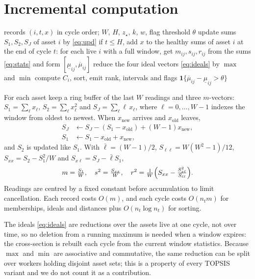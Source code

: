 \documentclass[journal,10pt,twocolumn]{IEEEtran}
\begin{document}
\section{Incremental computation}
\label{sec:stream}
\begin{algorithm}[t]
\caption{Windowed IT2-TOPSIS on a record stream}
\label{alg:main}
\begin{algorithmic}[1]
\REQUIRE records $(i,t,x)$ in cycle order; $W$, $H$, $z_\star$, $k$, $w$, flag threshold $\theta$
\STATE update sums $S_1,S_2,S_J$ of asset $i$ by \eqref{eq:upd} 
\STATE if $t\le H$, add $x$ to the healthy sums of asset $i$
\ENDFOR
\STATE at the end of cycle $t$: for each live $i$ with a full window, get $m_{ij},s_{ij},r_{ij}$ from the sums \eqref{eq:stats} and form $[\underline\mu_{ij},\overline\mu_{ij}]$
\STATE reduce the four ideal vectors \eqref{eq:ideals} by $\max$ and $\min$
\STATE compute $C_i$, sort, emit rank, intervals and flags $\mathbf 1\{\overline\mu_{ij}-\underline\mu_{ij}>\theta\}$
\end{algorithmic}
\end{algorithm}
For each asset keep a ring buffer of the last $W$ readings and three $m$-vectors: $S_1=\sum_\ell x_\ell$, $S_2=\sum_\ell x_\ell^2$ and $S_J=\sum_\ell \ell\,x_\ell$, where $\ell=0,\dots,W-1$ indexes the window from oldest to newest. When $x_{\mathrm{new}}$ arrives and $x_{\mathrm{old}}$ leaves,
\begin{align}
S_J&\leftarrow S_J-(S_1-x_{\mathrm{old}})+(W-1)x_{\mathrm{new}},\label{eq:upd}\\
S_1&\leftarrow S_1-x_{\mathrm{old}}+x_{\mathrm{new}},\nonumber
\end{align}
and $S_2$ is updated like $S_1$. With $\bar\ell=(W-1)/2$, $S_{\ell\ell}=W(W^2-1)/12$, $S_{xx}=S_2-S_1^2/W$ and $S_{x\ell}=S_J-\bar\ell S_1$,
\begin{equation}
m=\tfrac{S_1}{W},\quad s^2=\tfrac{S_{xx}}{W},\quad r^2=\tfrac{1}{W}\Bigl(S_{xx}-\tfrac{S_{x\ell}^2}{S_{\ell\ell}}\Bigr).
\label{eq:stats}
\end{equation}
Readings are centred by a fixed constant before accumulation to limit cancellation. Each record costs $O(m)$, and each cycle costs $O(n_t m)$ for memberships, ideals and distances plus $O(n_t\log n_t)$ for sorting.

The ideals \eqref{eq:ideals} are reductions over the assets live at one cycle, not over time, so no deletion from a running maximum is needed when a window expires: the cross-section is rebuilt each cycle from the current window statistics. Because $\max$ and $\min$ are associative and commutative, the same reduction can be split over workers holding disjoint asset sets; this is a property of every TOPSIS variant and we do not count it as a contribution.
\end{document}
